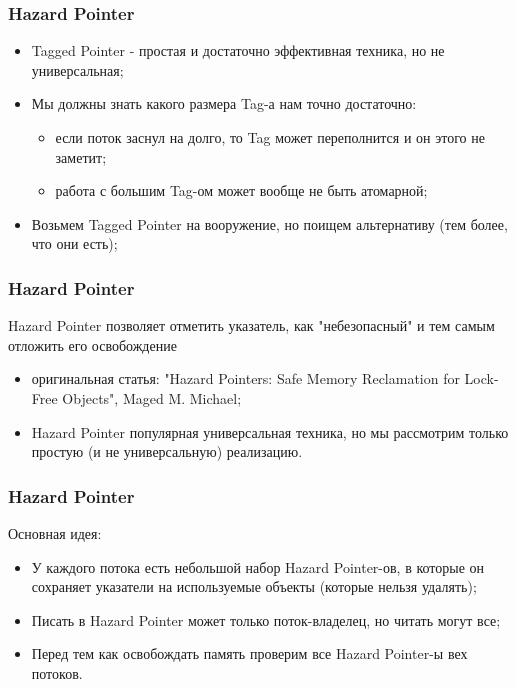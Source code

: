\begin{frame}
\frametitle{Hazard Pointer}

\begin{itemize}
  \item Tagged Pointer - простая и достаточно эффективная техника, но не универсальная;
  \item Мы должны знать какого размера Tag-а нам точно достаточно:
    \begin{itemize}
      \item если поток заснул на долго, то Tag может переполнится и он этого не заметит;
      \item работа с большим Tag-ом может вообще не быть атомарной;
    \end{itemize}
  \item Возьмем Tagged Pointer на вооружение, но поищем альтернативу (тем более, что они есть);
\end{itemize}
\end{frame}

\begin{frame}
\frametitle{Hazard Pointer}

Hazard Pointer позволяет отметить указатель, как "небезопасный" и тем самым отложить его освобождение
\begin{itemize}
  \item оригинальная статья: "Hazard Pointers: Safe Memory Reclamation for Lock-Free Objects", Maged M. Michael;
  \item Hazard Pointer популярная универсальная техника, но мы рассмотрим только простую (и не универсальную) реализацию.
\end{itemize}
\end{frame}

\begin{frame}
\frametitle{Hazard Pointer}

Основная идея:
\begin{itemize}
  \item У каждого потока есть небольшой набор Hazard Pointer-ов, в которые он сохраняет указатели на используемые объекты (которые нельзя удалять);
  \item Писать в Hazard Pointer может только поток-владелец, но читать могут все;
  \item Перед тем как освобождать память проверим все Hazard Pointer-ы вех потоков.
\end{itemize}
\end{frame}

